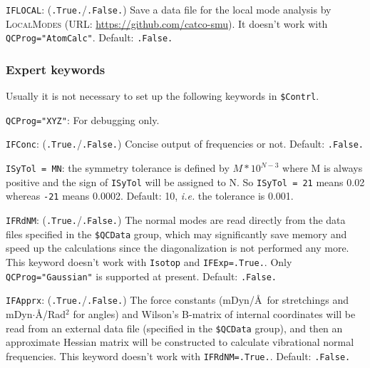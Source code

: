\documentclass[12pt,english]{extarticle}
\begin{document}
\bigskip{}\bigskip{}
\verb|IFLOCAL|: (\verb|.True.|/\verb|.False.|) Save a data file for the local mode analysis by \textsc{LocalModes} (URL: \href{https://github.com/catco-smu}{https://github.com/catco-smu}). It doesn't work with \verb|QCProg="AtomCalc"|. Default: \verb|.False.|

\subsubsection{Expert keywords} \label{subsec:inp-qcdata-expert}

Usually it is not necessary to set up the following keywords in \texttt{\$Contrl}.

\bigskip{}\bigskip{}
\verb|QCProg="XYZ"|: For debugging only.

\bigskip{}\bigskip{}
\verb|IFConc|: (\verb|.True.|/\verb|.False.|) Concise output of frequencies or not. Default: \verb|.False.|

\bigskip{}\bigskip{}
\verb|ISyTol = MN|: the symmetry tolerance is defined by $M*10^{N-3}$ where M
is always positive and the sign of \verb|ISyTol| will be assigned to N. So
\verb|ISyTol = 21| means 0.02 whereas \verb|-21| means 0.0002. Default: 10, \emph{i.e.} the tolerance is 0.001.

\bigskip{}\bigskip{}
\verb|IFRdNM|: (\verb|.True.|/\verb|.False.|) The normal modes are read directly from the data files specified in the \texttt{\$QCData} group, which may significantly save memory and speed up the calculations since the diagonalization is not performed any more. This keyword
doesn't work with \verb|Isotop| and \verb|IFExp=.True.|. Only \verb|QCProg="Gaussian"| is supported at present. Default: \verb|.False.|

\bigskip{}
\verb|IFApprx|: (\verb|.True.|/\verb|.False.|) The force constants (mDyn/\AA ~for stretchings and mDyn$\cdot$\AA/Rad$^2$ for angles) and Wilson's B-matrix of internal coordinates will be read from an external data file (specified in the \texttt{\$QCData} group), and then an approximate Hessian matrix will be constructed to calculate vibrational normal frequencies.  This keyword
doesn't work with \verb|IFRdNM=.True.|. Default: \verb|.False.|
\end{document}
